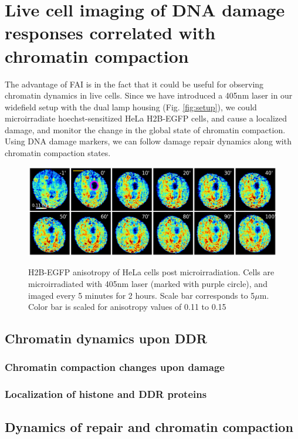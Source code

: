 \chapter{Live cell imaging of DNA damage responses correlated with chromatin compaction}
The advantage of FAI is in the fact that it could be useful for observing chromatin dynamics in live cells. Since we have introduced a 405nm laser in our widefield setup with the dual lamp housing (Fig. {\ref{fig:setup}}), we could microirradiate hoechst-sensitized HeLa H2B-EGFP cells, and cause a localized damage, and monitor the change in the global state of chromatin compaction. Using DNA damage markers, we can follow damage repair dynamics along with chromatin compaction states.

\begin{figure}[H]
    {\hfill\includegraphics[clip,width=1\linewidth]{figures/live_an.png}\hspace*{\fill}}
    \caption{H2B-EGFP anisotropy of HeLa cells post microirradiation. Cells are microirradiated with 405nm laser (marked with purple circle), and imaged every 5 minutes for 2 hours. Scale bar corresponds to 5$\mu$m. Color bar is scaled for anisotropy values of 0.11 to 0.15}
    {\label{fig:live_an}}
\end{figure}
\section{Chromatin dynamics upon DDR}
\subsection{Chromatin compaction changes upon damage}
\subsection{Localization of histone and DDR proteins}
\section{Dynamics of repair and chromatin compaction}
